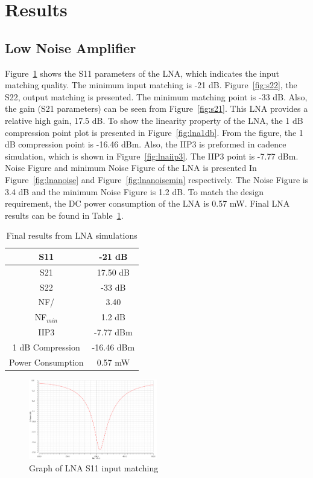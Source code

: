 \section{Results}
\subsection{Low Noise Amplifier}
Figure~\ref{fig:s11} shows the S11 parameters of the LNA, which indicates the input matching quality. The minimum input matching is -21 dB. Figure~\ref{fig:s22}, the S22, output matching is presented. The minimum matching point is -33 dB. Also, the gain (S21 parameters) can be seen from Figure~\ref{fig:s21}. This LNA provides a relative high gain, 17.5 dB. To show the linearity property of the LNA, the 1 dB compression point plot is presented in Figure~\ref{fig:lna1db}. From the figure, the 1 dB compression point is -16.46 dBm. Also, the IIP3 is preformed in cadence simulation, which is shown in Figure~\ref{fig:lnaiip3}. The IIP3 point is -7.77 dBm. Noise Figure and minimum Noise Figure of the LNA is presented In Figure~\ref{fig:lnanoise} and Figure~\ref{fig:lnanoisemin} respectively. The Noise Figure is 3.4 dB and the minimum Noise Figure is 1.2 dB. To match the design requirement, the DC power consumption of the LNA is 0.57 mW. Final LNA results can be found in Table~\ref{tab:lnaresults}.

\begin{table}[h]
\begin{center}
	\begin{tabular}{ c | c  }
 		                      
  		S11 & -21 dB \\ \hline
  		S21 &  17.50 dB \\ \hline
  		S22 & -33 dB \\ \hline
		NF/ & 3.40 \\ \hline
		NF$_{min}$ & 1.2 dB \\ \hline
		IIP3 & -7.77 dBm\\ \hline
		1 dB Compression & -16.46 dBm \\  \hline
		Power Consumption & 0.57 mW \\ 

	\end{tabular}

\end{center}
\caption{Final results from LNA simulations}
\label{tab:lnaresults}
\end{table}

\begin{figure}[H]
   \centering
    \includegraphics[width=0.5\textwidth]{figures/s11.png}
    \caption{Graph of LNA S11 input matching}
    \label{fig:s11}
\end{figure}

